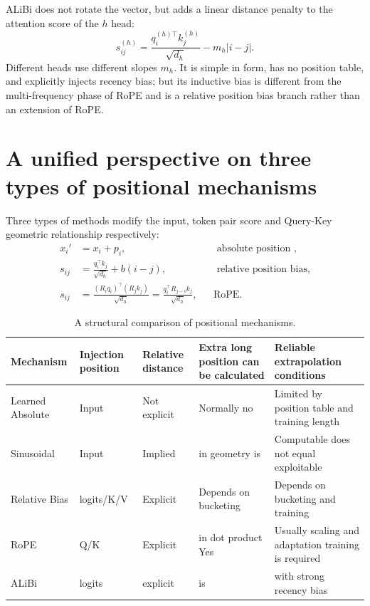 \documentclass[UTF8,fontset=none,a4paper,10pt]{ctexart}
\begin{document}
ALiBi does not rotate the vector, but adds a linear distance penalty \cite{en:press2022} to the attention score of the $h$ head:
\begin{equation}
  s_{ij}^{(h)}=
  \frac{q_i^{(h)\top}k_j^{(h)}}{\sqrt{d_h}}
  -m_h|i-j|.
  \label{en:eq:alibi}
\end{equation}
Different heads use different slopes $m_h$. It is simple in form, has no position table, and explicitly injects recency bias; but its inductive bias is different from the multi-frequency phase of RoPE and is a relative position bias branch rather than an extension of RoPE.

\section{A unified perspective on three types of positional mechanisms}

Three types of methods modify the input, token pair score and Query-Key geometric relationship respectively:
\begin{align}
x_i'&=x_i+p_i, &&\text{ absolute position }, \label{en:eq:unified-absolute}\\
s_{ij}&=\frac{q_i^\top k_j}{\sqrt{d_h}}+b(i-j), &&\text{ relative position bias}, \label{en:eq:unified-relative}\\
  s_{ij}&=\frac{(R_iq_i)^\top(R_jk_j)}{\sqrt{d_h}}
  =\frac{q_i^\top R_{j-i}k_j}{\sqrt{d_h}}, &&\text{RoPE}. \label{en:eq:unified-rope}
\end{align}

\begin{table}[htbp]
\centering
\footnotesize
\begin{tabularx}{\linewidth}{@{}p{2.2cm}p{1.5cm}p{1.8cm}p{1.8cm}X@{}}
\toprule
Mechanism & Injection position & Relative distance & Extra long position can be calculated & Reliable extrapolation conditions \\
\midrule
Learned Absolute & Input & Not explicit & Normally no & Limited by position table and training length \\
Sinusoidal & Input & Implied & in geometry is & Computable does not equal exploitable \\
Relative Bias & logits/K/V & Explicit & Depends on bucketing & Depends on bucketing and training \\
RoPE & Q/K & Explicit & in dot product Yes & Usually scaling and adaptation training is required \\
ALiBi & logits & explicit & is & with strong recency bias \\
\bottomrule
\end{tabularx}
\caption{A structural comparison of positional mechanisms.}
\label{en:tab:position-compare}
\end{table}
\end{document}
